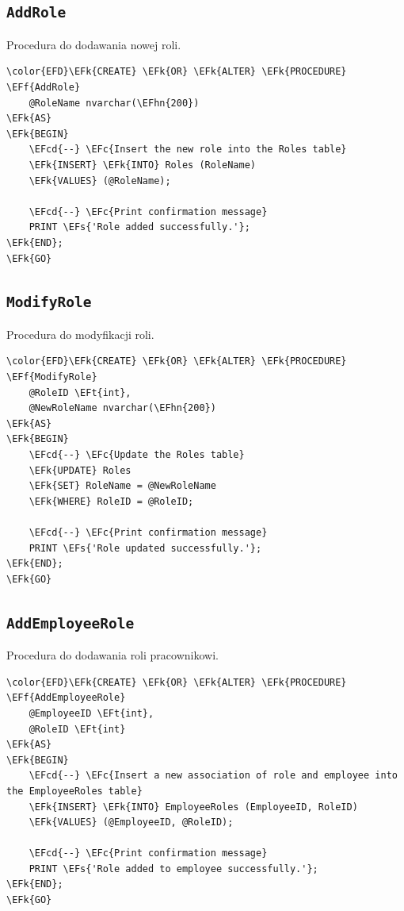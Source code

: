 \documentclass[11pt]{article}
\newcommand{\EFc}[1]{\textcolor{EFc}{\textit{#1}}} %
\newcommand{\EFcd}[1]{\textcolor{EFcd}{\textit{#1}}} %
\newcommand{\EFs}[1]{\textcolor{EFs}{#1}} %
\newcommand{\EFk}[1]{\textcolor{EFk}{\textbf{#1}}} %
\newcommand{\EFf}[1]{\textcolor{EFf}{#1}} %
\newcommand{\EFt}[1]{\textcolor{EFt}{\textbf{#1}}} %
\newcommand{\EFhn}[1]{\textcolor{EFhn}{#1}} %
\begin{document}
\subsection{\texttt{AddRole}}
\label{sec:org65478e0}
Procedura do dodawania nowej roli.
\begin{Code}
\begin{Verbatim}
\color{EFD}\EFk{CREATE} \EFk{OR} \EFk{ALTER} \EFk{PROCEDURE} \EFf{AddRole}
    @RoleName nvarchar(\EFhn{200})
\EFk{AS}
\EFk{BEGIN}
    \EFcd{--} \EFc{Insert the new role into the Roles table}
    \EFk{INSERT} \EFk{INTO} Roles (RoleName)
    \EFk{VALUES} (@RoleName);

    \EFcd{--} \EFc{Print confirmation message}
    PRINT \EFs{'Role added successfully.'};
\EFk{END};
\EFk{GO}
\end{Verbatim}
\end{Code}
\subsection{\texttt{ModifyRole}}
\label{sec:orgf427be7}
Procedura do modyfikacji roli.
\begin{Code}
\begin{Verbatim}
\color{EFD}\EFk{CREATE} \EFk{OR} \EFk{ALTER} \EFk{PROCEDURE} \EFf{ModifyRole}
    @RoleID \EFt{int},
    @NewRoleName nvarchar(\EFhn{200})
\EFk{AS}
\EFk{BEGIN}
    \EFcd{--} \EFc{Update the Roles table}
    \EFk{UPDATE} Roles
    \EFk{SET} RoleName = @NewRoleName
    \EFk{WHERE} RoleID = @RoleID;

    \EFcd{--} \EFc{Print confirmation message}
    PRINT \EFs{'Role updated successfully.'};
\EFk{END};
\EFk{GO}
\end{Verbatim}
\end{Code}
\subsection{\texttt{AddEmployeeRole}}
\label{sec:orgc08ea67}
Procedura do dodawania roli pracownikowi.
\begin{Code}
\begin{Verbatim}
\color{EFD}\EFk{CREATE} \EFk{OR} \EFk{ALTER} \EFk{PROCEDURE} \EFf{AddEmployeeRole}
    @EmployeeID \EFt{int},
    @RoleID \EFt{int}
\EFk{AS}
\EFk{BEGIN}
    \EFcd{--} \EFc{Insert a new association of role and employee into the EmployeeRoles table}
    \EFk{INSERT} \EFk{INTO} EmployeeRoles (EmployeeID, RoleID)
    \EFk{VALUES} (@EmployeeID, @RoleID);

    \EFcd{--} \EFc{Print confirmation message}
    PRINT \EFs{'Role added to employee successfully.'};
\EFk{END};
\EFk{GO}
\end{Verbatim}
\end{Code}
\end{document}
